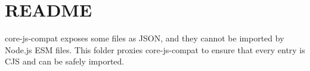 \chapter{README}
\hypertarget{md_pkiclassroomrescheduler_2src_2main_2frontend_2node__modules_2babel-plugin-polyfill-corejs3_2core-js-compat_2_r_e_a_d_m_e}{}\label{md_pkiclassroomrescheduler_2src_2main_2frontend_2node__modules_2babel-plugin-polyfill-corejs3_2core-js-compat_2_r_e_a_d_m_e}
{\ttfamily core-\/js-\/compat} exposes some files as JSON, and they cannot be imported by Node.\+js ESM files. This folder proxies {\ttfamily core-\/js-\/compat} to ensure that every entry is CJS and can be safely imported. 
